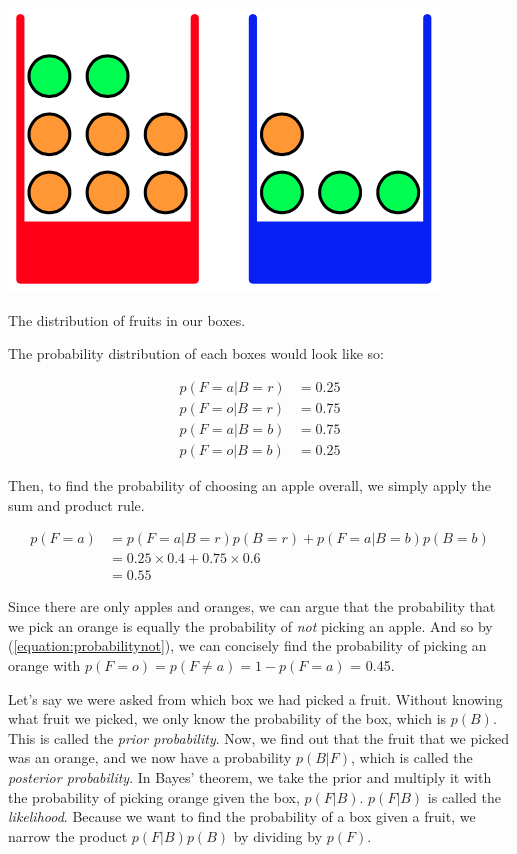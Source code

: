 \documentclass{tufte-handout}
\begin{document}
\begin{marginfigure}
  \includegraphics[width=\linewidth]{fruitboxes.png}
  \caption{The distribution of fruits in our boxes.}
\end{marginfigure}

The probability distribution of each boxes would look like so:

\begin{align}
  p(F = a | B = r) &= 0.25 \\
  p(F = o | B = r) &= 0.75 \\
  p(F = a | B = b) &= 0.75 \\
  p(F = o | B = b) &= 0.25
\end{align}

Then, to find the probability of choosing an apple overall, we simply apply the sum and product rule.

\begin{equation}
  \begin{aligned}
    p(F = a) &= p(F = a|B = r)p(B = r) + p(F = a|B = b)p(B = b)\\
             &= 0.25 \times 0.4 + 0.75 \times 0.6 \\
             &= 0.55
  \end{aligned}
\end{equation}

Since there are only apples and oranges, we can argue that the probability that we pick an orange is equally the probability of \emph{not} picking an apple. And so by (\ref{equation:probabilitynot}), we can concisely find the probability of picking an orange with $p(F = o) = p(F \neq a) = 1 - p(F = a)$ = 0.45.

Let's say we were asked from which box we had picked a fruit. Without knowing what fruit we picked, we only know the probability of the box, which is $p(B)$. This is called the \emph{prior probability}. Now, we find out that the fruit that we picked was an orange, and we now have a probability $p(B|F)$, which is called the \emph{posterior probability}. In Bayes' theorem, we take the prior and multiply it with the probability of picking orange given the box, $p(F|B)$. $p(F|B)$ is called the \emph{likelihood}. Because we want to find the probability of a box given a fruit, we narrow the product $p(F|B)p(B)$ by dividing by $p(F)$.
\end{document}
